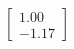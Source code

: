 \documentclass[preview]{standalone}
\begin{document}
\begin{align*}
\begin{bmatrix} 1.00 \\ -1.17 \end{bmatrix}
\end{align*}
\end{document}
